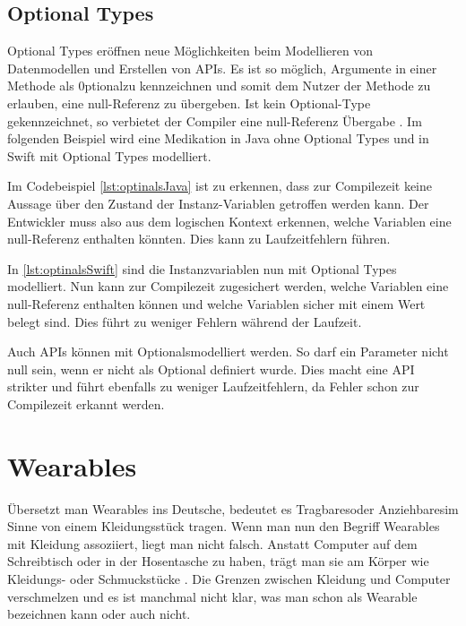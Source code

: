 \subsection{Optional Types}
\label{ch:optionals}
Optional Types eröffnen neue Möglichkeiten beim Modellieren von Datenmodellen und Erstellen von APIs. Es ist so möglich, Argumente in einer Methode als \glqq 0ptional\grqq  zu kennzeichnen und somit dem Nutzer der Methode zu erlauben, eine null-Referenz zu übergeben. Ist kein Optional-Type gekennzeichnet, so verbietet der Compiler eine null-Referenz Übergabe \cite{Apple:2014sp}. Im folgenden Beispiel wird eine Medikation in Java ohne Optional Types und in Swift mit Optional Types modelliert.
 

Im Codebeispiel \ref{lst:optinalsJava} ist zu erkennen, dass zur Compilezeit keine Aussage über den Zustand der Instanz-Variablen getroffen werden kann. Der Entwickler muss also aus dem logischen Kontext erkennen, welche Variablen eine null-Referenz enthalten könnten. Dies kann zu Laufzeitfehlern führen.


In \ref{lst:optinalsSwift} sind die Instanzvariablen nun mit Optional Types modelliert. Nun 
kann zur Compilezeit zugesichert werden, welche Variablen eine null-Referenz enthalten können und welche Variablen sicher mit einem Wert belegt sind. Dies führt zu weniger Fehlern während der Laufzeit.

Auch APIs können mit \glqq Optionals\grqq  modelliert werden. So darf ein Parameter nicht null sein, wenn er nicht als Optional definiert wurde. Dies macht eine API strikter und führt ebenfalls zu weniger Laufzeitfehlern, da Fehler schon zur Compilezeit erkannt werden.

\section{Wearables}
Übersetzt man Wearables ins Deutsche, bedeutet es \glqq Tragbares\grqq  oder \glqq Anziehbares\grqq  im Sinne von einem Kleidungsstück tragen. Wenn man nun den Begriff Wearables mit Kleidung assoziiert, liegt man nicht falsch. Anstatt Computer auf dem Schreibtisch oder in der Hosentasche zu haben, trägt man sie am Körper wie Kleidungs- oder Schmuckstücke \cite{Dvorak:2008aa}. Die Grenzen zwischen Kleidung und Computer verschmelzen und es ist manchmal nicht klar, was man schon als Wearable bezeichnen kann oder auch nicht.

